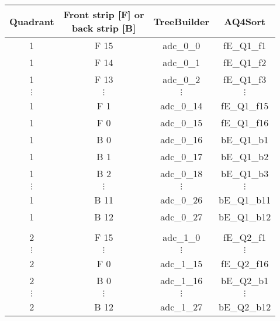 \begin{tabular}{cccc}
\hline
Quadrant  &  \shortstack{Front strip [F] or \\ back strip [B]}  &  TreeBuilder  &  AQ4Sort      \\
\hline
1         &  F 15             				   				    &  adc\_0\_0    &  fE\_Q1\_f1   \\
1         &  F 14             				   				    &  adc\_0\_1    &  fE\_Q1\_f2   \\
1         &  F 13             				   				    &  adc\_0\_2    &  fE\_Q1\_f3   \\
$\vdots$  &  $\vdots$                  		   				    &  $\vdots$     &  $\vdots$     \\
1         &  F 1              				   				    &  adc\_0\_14   &  fE\_Q1\_f15  \\
1         &  F 0              				   				    &  adc\_0\_15   &  fE\_Q1\_f16  \\
1         &  B 0              				   				    &  adc\_0\_16   &  bE\_Q1\_b1   \\
1         &  B 1              				   				    &  adc\_0\_17   &  bE\_Q1\_b2   \\
1         &  B 2              				   				    &  adc\_0\_18   &  bE\_Q1\_b3   \\
$\vdots$  &  $\vdots$                  		   				    &  $\vdots$     &  $\vdots$     \\
1         &  B 11             				   				    &  adc\_0\_26   &  bE\_Q1\_b11  \\
1         &  B 12             				   				    &  adc\_0\_27   &  bE\_Q1\_b12  \\
          &                            		   				    &               &               \\
2         &  F 15             				   				    &  adc\_1\_0    &  fE\_Q2\_f1   \\
$\vdots$  &  $\vdots$                  		   				    &  $\vdots$     &  $\vdots$     \\
2         &  F 0              				   				    &  adc\_1\_15   &  fE\_Q2\_f16  \\
2         &  B 0              				   				    &  adc\_1\_16   &  bE\_Q2\_b1   \\
$\vdots$  &  $\vdots$                  		   				    &  $\vdots$     &  $\vdots$     \\
2         &  B 12             				   				    &  adc\_1\_27   &  bE\_Q2\_b12  \\

\end{tabular}
